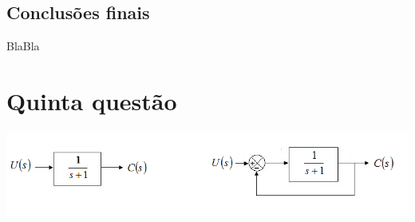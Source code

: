\documentclass[paper=a4, fontsize=11pt]{article}
\begin{document}
\subsection{Conclusões finais}

BlaBla

\section{Quinta questão}

\begin{center}
    \includegraphics[scale=0.5]{q5.png}
\end{center}
\end{document}
